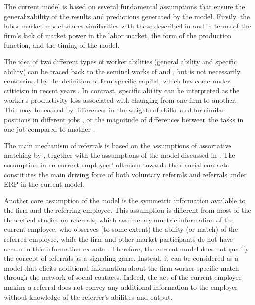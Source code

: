 \documentclass[12pt]{article}
\begin{document}
The current model is based on several fundamental assumptions that ensure the generalizability of the results and predictions generated by the model. Firstly, the labor market model shares similarities with those described in \cite{gibbons1999theory} and \cite{ekinci2016employee} in terms of the firm's lack of market power in the labor market, the form of the production function, and the timing of the model. 

The idea of two different types of worker abilities (general ability and specific ability) can be traced back to the seminal works of \cite{becker1962investment, becker1975investment} and \cite{jovanovic1979job}, but is not necessarily constrained by the definition of firm-specific capital, which has come under criticism in recent years  \citep{gibbons2004task, gathmann2010general}. In contrast, specific ability can be interpreted as the worker's productivity loss associated with changing from one firm to another. This may be caused by differences in the weights of skills used for similar positions in different jobs \citep{lazear2009firm}, or the magnitude of differences between the tasks in one job compared to another \citep{gibbons2004task}. 

The main mechanism of referrals is based on the assumptions of assortative matching by \cite{montgomery1991social}, together with the assumptions of the model discussed in \cite{friebel2023employee}. The assumption in \cite{friebel2023employee} on current employees' altruism towards their social contacts constitutes the main driving force of both voluntary referrals and referrals under ERP in the current model. 

Another core assumption of the model is the symmetric information available to the firm and the referring employee. This assumption is different from most of the theoretical studies on referrals, which assume asymmetric information of the current employee, who observes (to some extent) the ability (or match) of the referred employee, while the firm and other market participants do not have access to this information ex ante \citep{saloner1985old, beaman2012gets, ekinci2016employee}. Therefore, the current model does not qualify the concept of referrals as a signaling game. Instead, it can be considered as a model that elicits additional information about the firm-worker specific match through the network of social contacts. Indeed, the act of the current employee making a referral does not convey any additional information to the employer without knowledge of the referrer's abilities and output.
\end{document}
